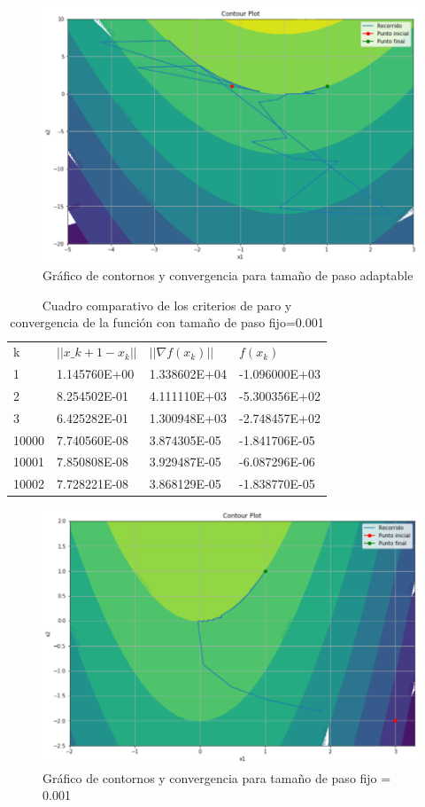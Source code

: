 \documentclass[journal]{IEEEtran}
\begin{document}
\begin{figure}[H]
    \centering
    \includegraphics[scale=0.25]{2.png}
    \caption{Gráfico de contornos y convergencia para tamaño de paso adaptable}
    \label{k}
\end{figure}


\begin{table}[H]
\begin{tabular}{@{}llll@{}}
k & $||x\_{k+1}-x_k||$ & $||\nabla f(x_k)||$ & $f(x_k)$ \\
1  &  1.145760E+00 &  1.338602E+04   &  -1.096000E+03  \\
2  &  8.254502E-01 &  4.111110E+03   &  -5.300356E+02  \\
3  &  6.425282E-01 &  1.300948E+03   &  -2.748457E+02  \\
10000  &  7.740560E-08 &  3.874305E-05   &  -1.841706E-05 \\
10001  &  7.850808E-08 &  3.929487E-05   &  -6.087296E-06  \\
10002  &  7.728221E-08 &  3.868129E-05   &  -1.838770E-05
\end{tabular}
\caption{Cuadro comparativo de los criterios de paro y convergencia de la función con tamaño de paso fijo=0.001}
\end{table}

\begin{figure}[H]
    \centering
    \includegraphics[scale=0.25]{3.png}
    \caption{Gráfico de contornos y convergencia para tamaño de paso fijo = 0.001}
    \label{k}
\end{figure}
\end{document}
